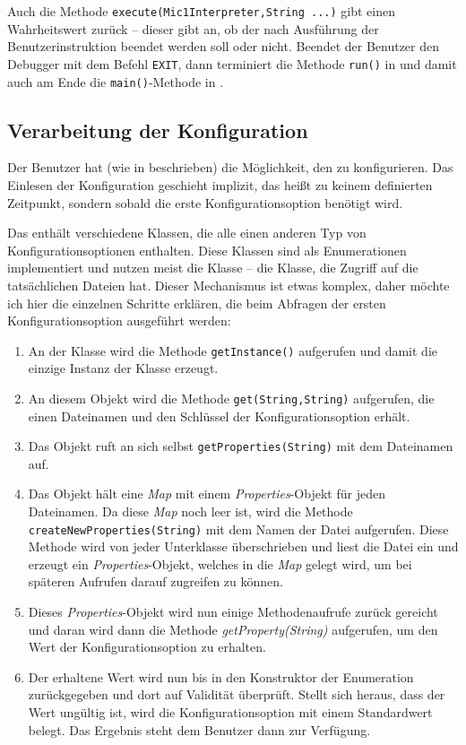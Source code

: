 Auch die Methode \texttt{execute(Mic1Interpreter,String ...)} gibt einen Wahrheitswert zurück -- dieser gibt an, ob der \md nach Ausführung der Benutzerinstruktion beendet werden soll oder nicht. Beendet der Benutzer den Debugger mit dem Befehl \texttt{EXIT}, dann terminiert die Methode \texttt{run()} in  und damit auch am Ende die \texttt{main()}-Methode in .

\subsection{Verarbeitung der Konfiguration}
Der Benutzer hat (wie in  beschrieben) die Möglichkeit, den \md zu konfigurieren. Das Einlesen der Konfiguration geschieht implizit, das heißt zu keinem definierten Zeitpunkt, sondern sobald die erste Konfigurationsoption benötigt wird.

Das \package {} enthält verschiedene Klassen, die alle einen anderen Typ von Konfigurationsoptionen enthalten. Diese Klassen sind als Enumerationen implementiert und nutzen meist die Klasse  -- die Klasse, die Zugriff auf die tatsächlichen Dateien hat. Dieser Mechanismus ist etwas komplex, daher möchte ich hier die einzelnen Schritte erklären, die beim Abfragen der ersten Konfigurationsoption ausgeführt werden:

\begin{enumerate}
\item An der Klasse  wird die Methode \texttt{getInstance()} aufgerufen und damit die einzige Instanz der Klasse erzeugt.
\item An diesem Objekt wird die Methode \texttt{get(String,String)} aufgerufen, die einen Dateinamen und den Schlüssel der Konfigurationsoption erhält.
\item Das Objekt ruft an sich selbst \texttt{getProperties(String)} mit dem Dateinamen auf.
\item Das Objekt hält eine \emph{Map} mit einem \emph{Properties}-Objekt für jeden Dateinamen. Da diese \emph{Map} noch leer ist, wird die Methode \texttt{createNewProperties(String)} mit dem Namen der Datei aufgerufen. Diese Methode wird von jeder Unterklasse überschrieben und liest die Datei ein und erzeugt ein \emph{Properties}-Objekt, welches in die \emph{Map} gelegt wird, um bei späteren Aufrufen darauf zugreifen zu können.
\item Dieses \emph{Properties}-Objekt wird nun einige Methodenaufrufe zurück gereicht und daran wird dann die Methode \emph{getProperty(String)} aufgerufen, um den Wert der Konfigurationsoption zu erhalten.
\item Der erhaltene Wert wird nun bis in den Konstruktor der Enumeration zurückgegeben und dort auf Validität überprüft. Stellt sich heraus, dass der Wert ungültig ist, wird die Konfigurationsoption mit einem Standardwert belegt. Das Ergebnis steht dem Benutzer dann zur Verfügung.
\end{enumerate}

